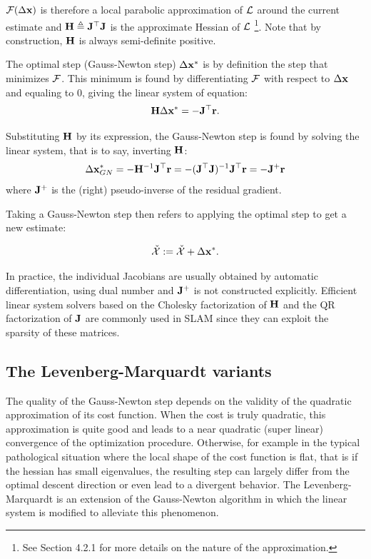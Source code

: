 $\mathcal{F}(\Delta {\bf x})$ is therefore a local parabolic approximation of 
$\mathcal{L}$ around the current estimate and ${\bf H} \triangleq {\bf J}^{\top} {\bf J}$ is the approximate Hessian of $\mathcal{L}$ 
\footnote{See \cite{sola2017course} Section 4.2.1 for more details on the nature of the approximation.}. Note that by construction, ${\bf H}$ is always 
semi-definite positive.


The optimal step (Gauss-Newton step) $\Delta {\bf x}^*$ is by definition the step that minimizes $\mathcal{F}$. This minimum is found by differentiating $\mathcal{F}$ 
with respect to $\Delta {\bf x}$ and equaling to 0, giving the linear system of equation:
\begin{equation}
    \bfH \Delta \bfx^* = - \bfJ\tr \bfr.%
    \label{eq:linear_syst_GN}
\end{equation}

Substituting ${\bf H}$ by its expression, the Gauss-Newton step is found by solving the linear system, that is to say, inverting ${\bf H}$:
%
\begin{equation*}
    \Delta {\bf x}_{GN}^* = - {\bf H}^{-1} {\bf J}^{\top} {\bf r} = - ({\bf J}^{\top} {\bf J})^{-1} {\bf J}^{\top} {\bf r} = -  {\bf J}^{+} {\bf r}
\end{equation*}
%
where ${\bf J}^{+}$ is the (right) pseudo-inverse of the residual gradient. 

Taking a Gauss-Newton step then refers to applying the optimal step to get a new estimate:

\begin{equation}
    \check{\mathcal{X}} := \check{\mathcal{X}} + \Delta {\bf x}^*.
    \label{eq:gaussian_step}
\end{equation}

In practice, the individual Jacobians  are usually obtained by automatic differentiation, \eg using dual number \cite{ceres-solver} 
and ${\bf J}^{+}$ is not constructed explicitly. Efficient linear system solvers based on the Cholesky
factorization of ${\bf H}$ and the QR factorization of ${\bf J}$ are commonly used in SLAM since they can exploit the sparsity of these
matrices.


\subsection{The Levenberg-Marquardt variants}
\label{sec:LM}
The quality of the Gauss-Newton step depends on the validity of the quadratic approximation of its cost function. When the cost is truly quadratic, this approximation
is quite good and leads to a near quadratic (super linear) convergence of the optimization procedure. Otherwise, for example in the typical 
pathological situation where the local shape of the cost function is flat, that is if the hessian has small eigenvalues, 
the resulting step can largely differ from the optimal descent direction or even lead to a 
divergent behavior. The Levenberg-Marquardt is an extension of the Gauss-Newton algorithm in which the linear system  is modified
to alleviate this phenomenon.



